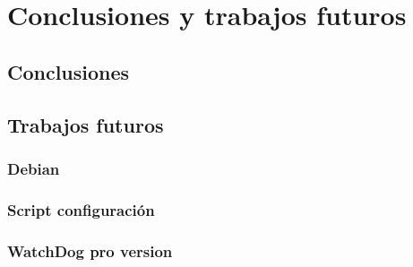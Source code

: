 \chapter{Conclusiones y trabajos futuros}
\label{cap_conclusiones}

\section{Conclusiones}
\section{Trabajos futuros}
	\subsection{Debian}
	\subsection{Script configuración}
	\subsection{WatchDog pro version}

